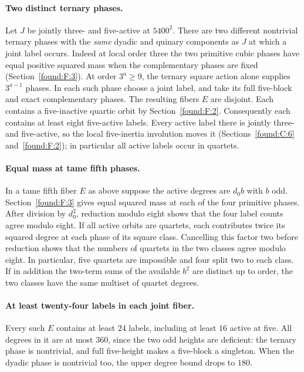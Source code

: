 \documentclass[11pt,a4paper]{article}
\numberwithin{equation}{section}
\theoremstyle{remark}
\begin{document}
\paragraph{Two distinct ternary phases.}\label{por:two-ternary-fibers}
Let $J$ be jointly three- and five-active at $5400^2$. There are two different nontrivial ternary phases with the \emph{same} dyadic and quinary components as $J$ at which a joint label occurs. Indeed at local order three the two primitive cubic phases have equal positive squared mass when the complementary phases are fixed (Section~\ref{found:F:3}). At order $3^a\ge9$, the ternary square action alone supplies $3^{a-1}$ phases. In each such phase choose a joint label, and take its full five-block and exact complementary phases. The resulting fibers $E$ are disjoint. Each contains a five-inactive quartic orbit by Section~\ref{found:F:2}. Consequently each contains at least eight five-active labels. Every active label there is jointly three- and five-active, so the local five-inertia involution moves it (Sections~\ref{found:C:6} and~\ref{found:F:2}); in particular all active labels occur in quartets.

\paragraph{Equal mass at tame fifth phases.}\label{por:tame-fiber-masses}
In a tame fifth fiber $E$ as above suppose the active degrees are $d_0b$ with $b$ odd. Section~\ref{found:F:3} gives equal squared mass at each of the four primitive phases. After division by $d_0^2$, reduction modulo eight shows that the four label counts agree modulo eight. If all active orbits are quartets, each contributes twice its squared degree at each phase of its square class. Cancelling this factor two before reduction shows that the numbers of quartets in the two classes agree modulo eight. In particular, five quartets are impossible and four split two to each class. If in addition the two-term sums of the available $b^2$ are distinct up to order, the two classes have the same multiset of quartet degrees.

\paragraph{At least twenty-four labels in each joint fiber.}\label{por:24-joint}
Every such $E$ contains at least $24$ labels, including at least $16$ active at five. All degrees in it are at most $360$, since the two odd heights are deficient: the ternary phase is nontrivial, and full five-height makes a five-block a singleton. When the dyadic phase is nontrivial too, the upper degree bound drops to $180$.
\end{document}
